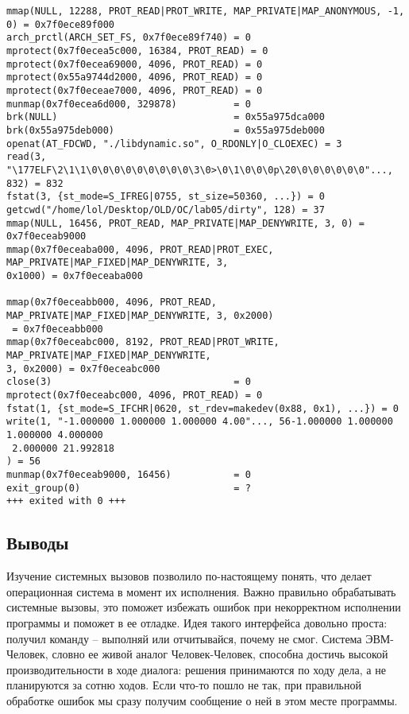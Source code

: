 \documentclass[12pt]{article}
\begin{document}
{{\begin{lstlisting}[escapechar=!]
mmap(NULL, 12288, PROT_READ|PROT_WRITE, MAP_PRIVATE|MAP_ANONYMOUS, -1, 0) = 0x7f0ece89f000
arch_prctl(ARCH_SET_FS, 0x7f0ece89f740) = 0
mprotect(0x7f0ecea5c000, 16384, PROT_READ) = 0
mprotect(0x7f0ecea69000, 4096, PROT_READ) = 0
mprotect(0x55a9744d2000, 4096, PROT_READ) = 0
mprotect(0x7f0eceae7000, 4096, PROT_READ) = 0
munmap(0x7f0ecea6d000, 329878)          = 0
brk(NULL)                               = 0x55a975dca000
brk(0x55a975deb000)                     = 0x55a975deb000
openat(AT_FDCWD, "./libdynamic.so", O_RDONLY|O_CLOEXEC) = 3
read(3, "\177ELF\2\1\1\0\0\0\0\0\0\0\0\0\3\0>\0\1\0\0\0p\20\0\0\0\0\0\0"..., 832) = 832
fstat(3, {st_mode=S_IFREG|0755, st_size=50360, ...}) = 0
getcwd("/home/lol/Desktop/OLD/OC/lab05/dirty", 128) = 37
mmap(NULL, 16456, PROT_READ, MAP_PRIVATE|MAP_DENYWRITE, 3, 0) = 0x7f0eceab9000
mmap(0x7f0eceaba000, 4096, PROT_READ|PROT_EXEC, MAP_PRIVATE|MAP_FIXED|MAP_DENYWRITE, 3, 
0x1000) = 0x7f0eceaba000

mmap(0x7f0eceabb000, 4096, PROT_READ, MAP_PRIVATE|MAP_FIXED|MAP_DENYWRITE, 3, 0x2000)
 = 0x7f0eceabb000
mmap(0x7f0eceabc000, 8192, PROT_READ|PROT_WRITE, MAP_PRIVATE|MAP_FIXED|MAP_DENYWRITE, 
3, 0x2000) = 0x7f0eceabc000
close(3)                                = 0
mprotect(0x7f0eceabc000, 4096, PROT_READ) = 0
fstat(1, {st_mode=S_IFCHR|0620, st_rdev=makedev(0x88, 0x1), ...}) = 0
write(1, "-1.000000 1.000000 1.000000 4.00"..., 56-1.000000 1.000000 1.000000 4.000000
 2.000000 21.992818
) = 56
munmap(0x7f0eceab9000, 16456)           = 0
exit_group(0)                           = ?
+++ exited with 0 +++
\end{lstlisting}
}
\subsection*{Выводы}

Изучение системных вызовов позволило по-настоящему понять, что делает операционная система в момент их исполнения. Важно правильно обрабатывать системные
вызовы, это поможет избежать ошибок при некорректном исполнении программы и
поможет в ее отладке. Идея такого интерфейса довольно проста: получил команду --
выполняй или отчитывайся, почему не смог. Система ЭВМ-Человек, словно ее живой аналог Человек-Человек, способна достичь высокой производительности в ходе
диалога: решения принимаются по ходу дела, а не планируются за сотню ходов. Если
что-то пошло не так, при правильной обработке ошибок мы сразу получим сообщение о ней в этом месте программы.

}
\end{document}
